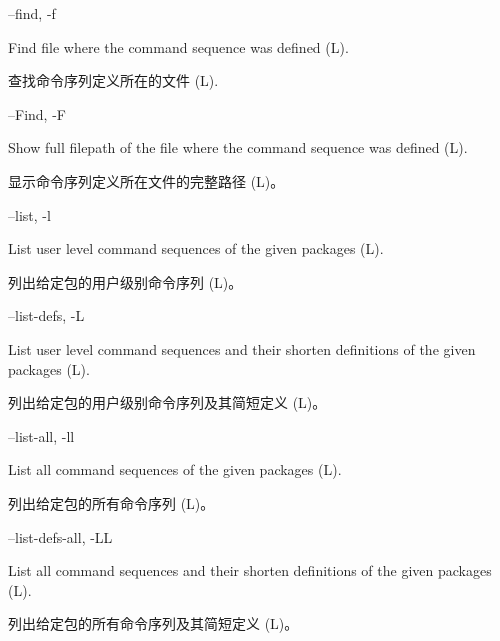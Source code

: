 \documentclass{article}
\newenvironment{options}{%
    \def\cstart{\begingroup\ttfamily\par\noindent\ignorespaces}%
    \def\csep{\endgroup\begingroup\list {}{}\item \relax}%
    \def\cend{\endlist\par\medskip\endgroup\cstart}%
    \cstart
}{%
    \endgroup
}
\begin{document}
\begin{options}
  --find, -f                                         \csep 
Find file where the command sequence was defined (L).

查找命令序列定义所在的文件 (L).
\cend
\end{options}

\begin{options}
--Find, -F                                         \csep 
Show full filepath of the file where the command sequence was defined (L).

显示命令序列定义所在文件的完整路径 (L)。
\cend
\end{options}

\begin{options}
--list, -l                                         \csep 
List user level command sequences of the given packages (L).

列出给定包的用户级别命令序列 (L)。
\cend
\end{options}

\begin{options}
--list-defs, -L                                    \csep 
List user level command sequences and their shorten definitions of the given packages (L).

列出给定包的用户级别命令序列及其简短定义 (L)。
\cend
\end{options}

\begin{options}
--list-all, -ll                                    \csep 
List all command sequences of the given packages (L).

列出给定包的所有命令序列 (L)。
\cend
\end{options}

\begin{options}
--list-defs-all, -LL                               \csep 
List all command sequences and their shorten definitions of the given packages (L).

列出给定包的所有命令序列及其简短定义 (L)。
\cend
\end{options}
\end{document}
